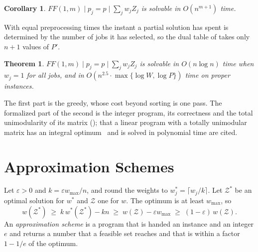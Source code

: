 \documentclass[11pt,a4paper]{article}
\newtheorem{theorem}{Theorem}
\newtheorem{corollary}{Corollary}
\theoremstyle{definition}
\theoremstyle{plain}
\newcommand{\wmax}{w_{\max}}
\newcommand{\calZ}{\mathcal{Z}}
\begin{document}
\begin{corollary}\label{cor:uniform}
$FF(1,m)\mid p_j=p\mid\sum_jw_jZ_j$ is solvable in $O(n^{m+1})$ time.
\end{corollary}
With equal preprocessing times the instant a partial solution has spent is determined by the
number of jobs it has selected, so the dual table of  takes only $n+1$ values of
$P'$.

\setcounter{theorem}{3}
\begin{theorem}\label{thm:Uniform}
$FF(1,m)\mid p_j=p\mid\sum_jw_jZ_j$ is solvable in $O(n\log n)$ time when $w_j=1$ for all
jobs, and in $O(n^{2.5}\cdot\max\{\log W,\log P\})$ time on proper instances.
\end{theorem}
The first part is the greedy, whose cost beyond sorting is one pass. The formalized part of the
second is the integer program, its correctness and the total unimodularity of its matrix
(); that a linear program with a totally unimodular matrix has an integral
optimum~\cite{HK56} and is solved in polynomial time are cited.

\section{Approximation Schemes}\label{sec:approx}

Let $\varepsilon>0$ and $k=\varepsilon\wmax/n$, and round the weights to $w_j^*=\lceil
w_j/k\rceil$. Let $\calZ^*$ be an optimal solution for $w^*$ and $\calZ$ one for $w$. The
optimum is at least $\wmax$, so
\begin{equation}\label{eq:rounding}
w(\calZ^*)\;\ge\;k\,w^*(\calZ^*)-kn\;\ge\;w(\calZ)-\varepsilon\wmax\;\ge\;(1-\varepsilon)\,w(\calZ).
\end{equation}
An \emph{approximation scheme} is a program that is handed an instance and an integer $e$ and
returns a number that a feasible set reaches and that is within a factor $1-1/e$ of the optimum.
\end{document}
